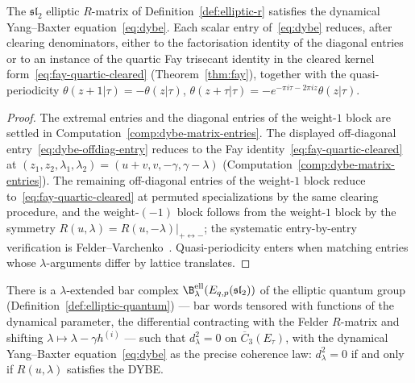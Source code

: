 \begin{theorem}
\label{prop:dybe-reduces-to-fay}
The $\mathfrak{sl}_2$ elliptic $R$-matrix of
Definition~\ref{def:elliptic-r} satisfies the dynamical Yang--Baxter
equation~\eqref{eq:dybe}. Each scalar entry of~\eqref{eq:dybe}
reduces, after clearing denominators, either to the factorisation
identity of the diagonal entries or to an instance of the quartic Fay
trisecant identity in the cleared kernel
form~\eqref{eq:fay-quartic-cleared}
\textup{(}Theorem~\textup{\ref{thm:fay})}, together with the
quasi-periodicity $\theta(z+1|\tau) = -\theta(z|\tau)$,
$\theta(z+\tau|\tau) = -e^{-\pi i\tau - 2\pi i z}\theta(z|\tau)$.
\end{theorem}

\begin{proof}
The extremal entries and the diagonal entries of the weight-$1$ block
are settled in Computation~\ref{comp:dybe-matrix-entries}. The
displayed off-diagonal entry~\eqref{eq:dybe-offdiag-entry} reduces to
the Fay identity~\eqref{eq:fay-quartic-cleared} at
$(z_1, z_2, \lambda_1, \lambda_2) = (u{+}v, v, -\gamma,
\gamma{-}\lambda)$ (Computation~\ref{comp:dybe-matrix-entries}). The
remaining off-diagonal entries of the weight-$1$ block reduce
to~\eqref{eq:fay-quartic-cleared} at permuted specializations by the
same clearing procedure, and the weight-$(-1)$ block follows from the
weight-$1$ block by the symmetry
$R(u,\lambda) = R(u,-\lambda)|_{+\leftrightarrow -}$; the systematic
entry-by-entry verification is
Felder--Varchenko~\cite{Felder94,FelderVarchenko96}. Quasi-periodicity
enters when matching entries whose $\lambda$-arguments differ by
lattice translates.
\end{proof}

\begin{conjecture}
\label{conj:dynamical-bar-nilpotency}
\ClaimStatusConjectured
{}
There is a $\lambda$-extended bar complex
$\B^{\mathrm{ell}}_\lambda(E_{q,p}(\mathfrak{sl}_2))$ of the elliptic
quantum group
\textup{(}Definition~\textup{\ref{def:elliptic-quantum})} --- bar
words tensored with functions of the dynamical parameter, the
differential contracting with the Felder $R$-matrix and shifting
$\lambda \mapsto \lambda - \gamma h^{(i)}$ --- such that
$d_\lambda^2 = 0$ on $\overline{C}_3(E_\tau)$, with the dynamical
Yang--Baxter equation~\eqref{eq:dybe} as the precise coherence law:
$d_\lambda^2 = 0$ if and only if $R(u,\lambda)$ satisfies the DYBE.
\end{conjecture}

